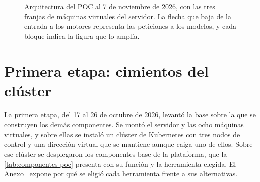 \begin{figure}[htbp]
  \caption[Arquitectura del POC al 7 de noviembre de 2026]{Arquitectura del POC al 7 de noviembre de 2026, con las tres franjas de máquinas virtuales del servidor. La flecha que baja de la entrada a los motores representa las peticiones a los modelos, y cada bloque indica la figura que lo amplía.}
  \label{fig:arquitectura-poc}
\end{figure}

\section{Primera etapa: cimientos del clúster}\label{sec:avance-etapa1}

La primera etapa, del 17 al 26 de octubre de 2026, levantó la base sobre la que se construyen los demás componentes. Se montó el servidor y las ocho máquinas virtuales, y sobre ellas se instaló un clúster de Kubernetes con tres nodos de control y una dirección virtual que se mantiene aunque caiga uno de ellos. Sobre ese clúster se desplegaron los componentes base de la plataforma, que la \cref{tab:componentes-poc} presenta con su función y la herramienta elegida. El Anexo~ expone por qué se eligió cada herramienta frente a sus alternativas.

